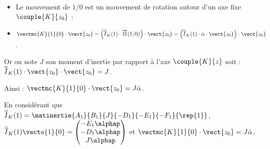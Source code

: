 \ifprof
\begin{corrige}
\begin{itemize}
\item Le mouvement de $1/0$ est un mouvement de rotation autour d'un axe fixe $\couple{K}{{z}_0}$ : 

\item $\vectmc{K}{1}{0}\cdot \vect{z_0}=\left(\overline{\overline{I}}_K(1)\cdot \overrightarrow{\Omega}(1/0)\right)\cdot \vect{z_0}=\left(\overline{\overline{I}}_K(1)\cdot \dot{\alpha}\cdot \vect{z_0} \right)\cdot \vect{z_0}$.
\end{itemize}


Or on note $J$ son moment d'inertie par rapport à l'axe $\couple{K}{{z}}$ soit : 
$\overline{\overline{I}}_K(1)\cdot\vect{z_0}\cdot \vect{z_0}=J$.

Ainsi : 
$\vectmc{K}{1}{0}\cdot \vect{z_0}=J \dot{\alpha}$.


\begin{remarque}
En considérant que $\overline{\overline{I}}_K(1) = \matinertie{A_1}{B_1}{J}{-D_1}{-E_1}{-F_1}{\rep{1}}$,
$\overline{\overline{I}}_K(1) \vecto{1}{0} = \begin{pmatrix} -E_1 \alphap \\ -D_1 \alphap \\ J \alphap  \end{pmatrix}$ et $\vectmc{K}{1}{0}\cdot \vect{z_0}=J \dot{\alpha}$.
\end{remarque}


\end{corrige}
\else
\fi


